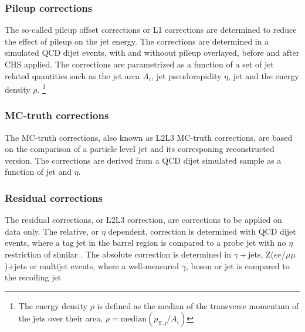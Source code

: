 \subsubsection*{Pileup corrections}
\noindent\justify
The so-called pileup offset corrections or L1 corrections are determined to reduce the effect of pileup on the jet energy. 
The corrections are determined in a simulated QCD dijet events, with and withoout pileup overlayed, before and after CHS applied. 
The corrections are parametrized as a function of a set of jet related quantities such as the jet area $A_{i}$, jet pseudorapidity $\eta$, jet \pt and the energy density $\rho$. \footnote{The energy density $\rho$ is defined as the median of the transverse momentum of the jets over their area, $\rho=\mathrm{median}(p_{\mathrm{T,i}}/ A_{i})$ } 
\subsubsection*{MC-truth corrections} 
\noindent\justify
The MC-truth corrections, also known as L2L3 MC-truth corrections, are based on the comparison of a particle level jet and its corresponing reconstructed version. 
The corrections are derived from a QCD dijet simulated sample as a function of jet \pt and $\eta$. 
\subsubsection*{Residual corrections}
\noindent\justify
The residual corrections, or L2L3 correction, are corrections to be applied on data only. 
The relative, or $\eta$ dependent, correction is determined with QCD dijet events, where a tag jet in the barrel region is compared to a probe jet with no $\eta$ restriction of similar \pt. 
The absolute correction is determined in $\gamma+$jets, Z($ee$/$\mu\mu$)+jets or multijet events, where a well-measured $\gamma$, \PZ boson or jet is compared to the recoiling jet 
